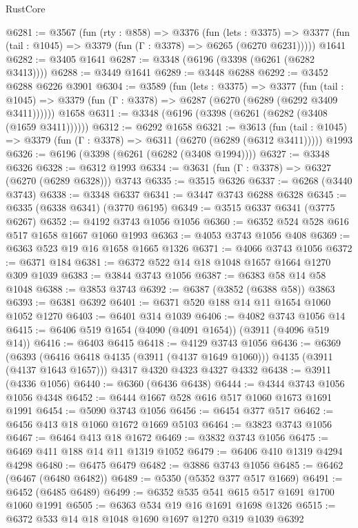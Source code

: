 \begin{lexlean}{RustCore}
\begin{coremodule}
@6281 := @3567
    (fun (rty : @858) =>
    @3376
      (fun (lets : @3375) =>
      @3377 (fun (tail : @1045) => @3379 (fun (Γ : @3378) => @6265 (@6270 @6231)))))
    @1641
@6282 := @3405 @1641
@6287 := @3348 (@6196 (@3398 (@6261 (@6282 @3413))))
@6288 := @3449 @1641
@6289 := @3448 @6288
@6292 := @3452 @6288 @6226 @3901
@6304 := @3589
    (fun (lets : @3375) =>
    @3377
      (fun (tail : @1045) => @3379 (fun (Γ : @3378) => @6287 (@6270 (@6289 (@6292 @3409 @3411))))))
    @1658
@6311 := @3348 (@6196 (@3398 (@6261 (@6282 (@3408 (@1659 @3411))))))
@6312 := @6292 @1658
@6321 := @3613
    (fun (tail : @1045) => @3379 (fun (Γ : @3378) => @6311 (@6270 (@6289 (@6312 @3411)))))
    @1993
@6326 := @6196 (@3398 (@6261 (@6282 (@3408 @1994))))
@6327 := @3348 @6326
@6328 := @6312 @1993
@6334 := @3631 (fun (Γ : @3378) => @6327 (@6270 (@6289 @6328))) @3743
@6335 := @3515 @6326
@6337 := @6268 (@3440 @3743)
@6338 := @3348 @6337
@6341 := @3447 @3743 @6288 @6328
@6345 := @6335 (@6338 @6341) (@3770 @6195)
@6349 := @3515 @6337 @6341 (@3775 @6267)
@6352 := @4192 @3743 @1056 @1056
@6360 := @6352 @524 @528 @616 @517 @1658 @1667 @1060 @1993
@6363 := @4053 @3743 @1056 @408
@6369 := @6363 @523 @19 @16 @1658 @1665 @1326
@6371 := @4066 @3743 @1056
@6372 := @6371 @184
@6381 := @6372 @522 @14 @18 @1048 @1657 @1664 @1270 @309 @1039
@6383 := @3844 @3743 @1056
@6387 := @6383 @58 @14 @58 @1048
@6388 := @3853 @3743
@6392 := @6387 (@3852 (@6388 @58)) @3863
@6393 := @6381 @6392
@6401 := @6371 @520 @188 @14 @11 @1654 @1060 @1052 @1270
@6403 := @6401 @314 @1039
@6406 := @4082 @3743 @1056 @14
@6415 := @6406 @519 @1654 (@4090 (@4091 @1654)) (@3911 (@4096 @519 @14))
@6416 := @6403 @6415
@6418 := @4129 @3743 @1056
@6436 := @6369
    (@6393 (@6416 @6418 @4135 (@3911 (@4137 @1649 @1060))) @4135 (@3911 (@4137 @1643 @1657)))
    @4317
    @4320
    @4323
    @4327
    @4332
@6438 := @3911 (@4336 @1056)
@6440 := @6360 (@6436 @6438)
@6444 := @4344 @3743 @1056 @1056 @4348
@6452 := @6444 @1667 @528 @616 @517 @1060 @1673 @1691 @1991
@6454 := @5090 @3743 @1056
@6456 := @6454 @377 @517
@6462 := @6456 @413 @18 @1060 @1672 @1669 @5103
@6464 := @3823 @3743 @1056
@6467 := @6464 @413 @18 @1672
@6469 := @3832 @3743 @1056
@6475 := @6469 @411 @188 @14 @11 @1319 @1052
@6479 := @6406 @410 @1319 @4294 @4298
@6480 := @6475 @6479
@6482 := @3886 @3743 @1056
@6485 := @6462 (@6467 (@6480 @6482))
@6489 := @5350 (@5352 @377 @517 @1669)
@6491 := @6452 (@6485 @6489)
@6499 := @6352 @535 @541 @615 @517 @1691 @1700 @1060 @1991
@6505 := @6363 @534 @19 @16 @1691 @1698 @1326
@6515 := @6372 @533 @14 @18 @1048 @1690 @1697 @1270 @319 @1039 @6392

\end{coremodule}
\end{lexlean}
